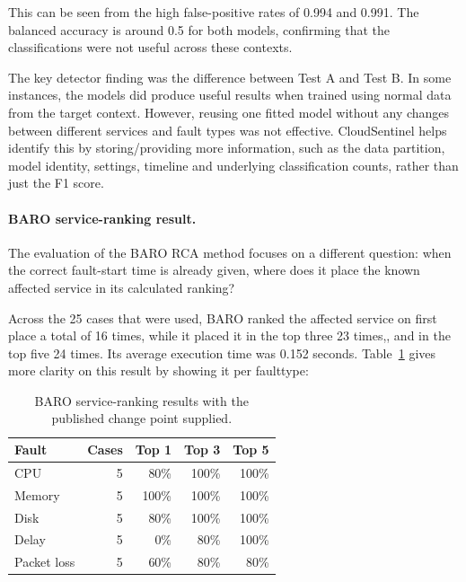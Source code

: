 This can be seen from the high false-positive rates of 0.994 and 0.991. The balanced accuracy is around 0.5 for both models, confirming that the classifications were not useful across these contexts. 

The key detector finding was the difference between Test A and Test B. In some instances, the models did produce useful results when trained using normal data from the target context. However, reusing one fitted model without any changes between different services and fault types was not effective. CloudSentinel helps identify this by storing/providing more information, such as the data partition, model identity, settings, timeline and underlying classification counts, rather than just the F1 score.

\paragraph{BARO service-ranking result.}
The evaluation of the BARO RCA method focuses on a different question: when the correct fault-start time is already given, where does it place the known affected service in its calculated ranking?

Across the 25 cases that were used, BARO ranked the affected service on first place a total of 16 times, while it placed it in the top three 23 times,, and in the top five 24 times. Its average execution time was 0.152 seconds. Table~\ref{tab:h9-rcaeval-baro-results} gives more clarity on this result by showing it per faulttype:

\begin{table}[H]
    \centering
    \small
    \caption{BARO service-ranking results with the published change point supplied.}
    \label{tab:h9-rcaeval-baro-results}
    \begin{tabular}{|l|r|r|r|r|}
        \hline
        Fault & Cases & Top 1 & Top 3 & Top 5 \\
        \hline
        CPU & 5 & 80\% & 100\% & 100\% \\
        Memory & 5 & 100\% & 100\% & 100\% \\
        Disk & 5 & 80\% & 100\% & 100\% \\
        Delay & 5 & 0\% & 80\% & 100\% \\
        Packet loss & 5 & 60\% & 80\% & 80\% \\
        \hline
    \end{tabular}
\end{table}



